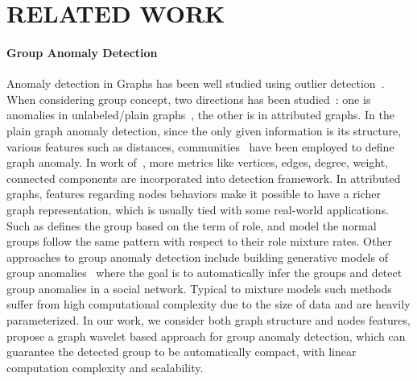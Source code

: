 \documentclass[conference]{IEEEtran}
\begin{document}
\section{RELATED WORK}
\label{sec:related}
\paragraph{Group Anomaly Detection}
Anomaly detection in Graphs has been well studied using outlier detection~\cite{akoglu2009anomaly}. When considering group concept, two directions has been studied~\cite{akoglu2015graph}: one is anomalies in unlabeled/plain graphs~\cite{noble2003graph}, the other is in attributed graphs. In the plain graph anomaly detection, since the only given information is its structure, various features such as distances, communities~\cite{sun2005neighborhood} have been employed to define graph anomaly. In work of~\cite{henderson2010metric}, more metrics like vertices, edges, degree, weight, connected components are incorporated into detection framework. In attributed graphs, features regarding nodes behaviors make it possible to have a richer graph representation, which is usually tied with some real-world applications. Such as \cite{yu2014glad} defines the group based on the term of role, and model the normal groups follow the same pattern with respect to their role mixture rates. Other approaches to group anomaly detection include building generative models of group anomalies~\cite{xiong2011hierarchical} where the goal is to automatically infer the groups and detect group anomalies in a social network. Typical to mixture models such methods suffer from high computational complexity due to the size of data and are heavily parameterized. In our work, we consider both graph structure and nodes features, propose a graph wavelet based approach for group anomaly detection, which can guarantee the detected group to be automatically compact, with linear computation complexity and scalability.
\end{document}
